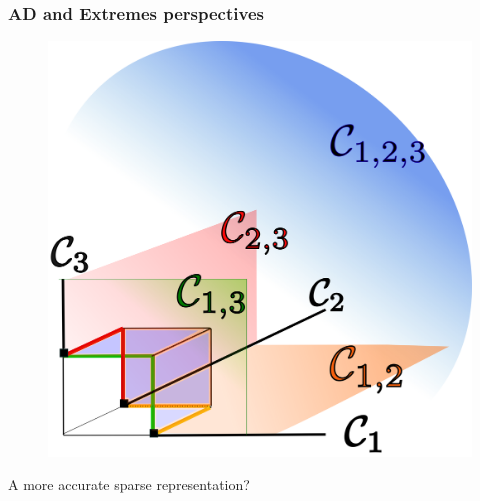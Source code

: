 \documentclass[9pt]{beamer}
\begin{document}

\begin{frame}
\frametitle{AD and Extremes perspectives}

  \begin{figure}
    \centering
    \includegraphics[width=0.4\linewidth]{sourcefigs/cone}
  \end{figure}


A more accurate sparse representation?
\end{frame}
\end{document}
